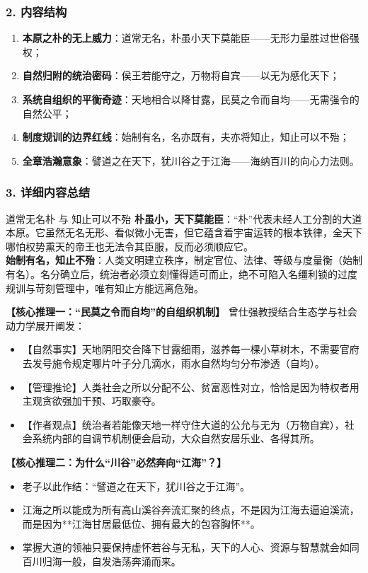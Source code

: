 \subsubsection{2. 内容结构}
\begin{enumerate}
    \item \textbf{本原之朴的无上威力}：道常无名，朴虽小天下莫能臣——无形力量胜过世俗强权；
    \item \textbf{自然归附的统治密码}：侯王若能守之，万物将自宾——以无为感化天下；
    \item \textbf{系统自组织的平衡奇迹}：天地相合以降甘露，民莫之令而自均——无需强令的自然公平；
    \item \textbf{制度规训的边界红线}：始制有名，名亦既有，夫亦将知止，知止可以不殆；
    \item \textbf{全章浩瀚意象}：譬道之在天下，犹川谷之于江海——海纳百川的向心力法则。
\end{enumerate}

\subsubsection{3. 详细内容总结}

\begin{ConceptBox}{道常无名朴 与 知止可以不殆}
\textbf{朴虽小，天下莫能臣}：“朴”代表未经人工分割的大道本原。它虽然无名无形、看似微小无害，但它蕴含着宇宙运转的根本铁律，全天下哪怕权势熏天的帝王也无法令其臣服，反而必须顺应它。\\
\textbf{始制有名，知止不殆}：人类文明建立秩序，制定官位、法律、等级与度量衡（始制有名）。名分确立后，统治者必须立刻懂得适可而止，绝不可陷入名缰利锁的过度规训与苛刻管理中，唯有知止方能远离危殆。
\end{ConceptBox}

\noindent\textbf{【核心推理一：“民莫之令而自均”的自组织机制】}
曾仕强教授结合生态学与社会动力学展开阐发：
\begin{itemize}
    \item 【自然事实】天地阴阳交合降下甘露细雨，滋养每一棵小草树木，不需要官府去发号施令规定哪片叶子分几滴水，雨水自然均匀分布渗透（自均）。
    \item 【管理推论】人类社会之所以分配不公、贫富恶性对立，恰恰是因为特权者用主观贪欲强加干预、巧取豪夺。
    \item 【作者观点】统治者若能像天地一样守住大道的公允与无为（万物自宾），社会系统内部的自调节机制便会启动，大众自然安居乐业、各得其所。
\end{itemize}

\noindent\textbf{【核心推理二：为什么“川谷”必然奔向“江海”？】}
\begin{itemize}
    \item 老子以此作结：“譬道之在天下，犹川谷之于江海”。
    \item 江海之所以能成为所有高山溪谷奔流汇聚的终点，不是因为江海去逼迫溪流，而是因为**江海甘居最低位、拥有最大的包容胸怀**。
    \item 掌握大道的领袖只要保持虚怀若谷与无私，天下的人心、资源与智慧就会如同百川归海一般，自发浩荡奔涌而来。
\end{itemize}

